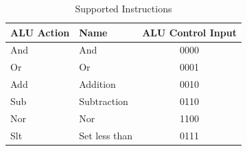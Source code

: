 \documentclass[12pt,a4paper]{article}
\theoremstyle{definition}
\begin{document}
\begin{table}[H]
\centering
\caption
{Supported Instructions}
\label{tab:support}
\begin{tabular}{llc} \toprule
ALU Action & Name & ALU Control Input \\
\midrule
And & And & 0000
\\
Or & Or & 0001
\\
Add & Addition & 0010
\\
Sub & Subtraction & 0110
\\
Nor & Nor & 1100
\\
Slt & Set less than & 0111
\\ \bottomrule
\end{tabular}
\end{table}




\end{document}
